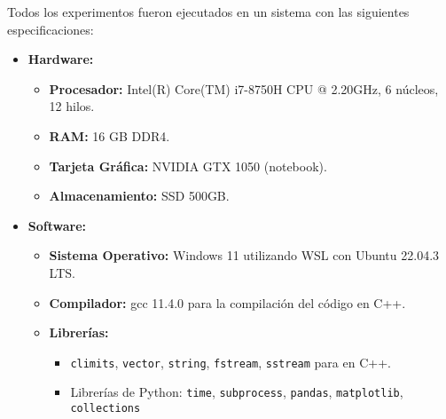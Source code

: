 Todos los experimentos fueron ejecutados en un sistema con las siguientes especificaciones:
\begin{itemize}
    \item \textbf{Hardware:}
    \begin{itemize}
        \item \textbf{Procesador:} Intel(R) Core(TM) i7-8750H CPU @ 2.20GHz, 6 núcleos, 12 hilos.
        \item \textbf{RAM:} 16 GB DDR4.
        \item \textbf{Tarjeta Gráfica:} NVIDIA GTX 1050 (notebook).
        \item \textbf{Almacenamiento:} SSD 500GB.
    \end{itemize}

    \item \textbf{Software:}
    \begin{itemize}
        \item \textbf{Sistema Operativo:} Windows 11 utilizando WSL con Ubuntu 22.04.3 LTS.
        \item \textbf{Compilador:} gcc 11.4.0 para la compilación del código en C++.
        \item \textbf{Librerías:} 
        \begin{itemize}
            \item \texttt{climits}, \texttt{vector}, \texttt{string}, \texttt{fstream}, \texttt{sstream} para en C++.
            \item Librerías de Python: \texttt{time}, \texttt{subprocess}, \texttt{pandas}, \texttt{matplotlib}, \texttt{collections} 
        \end{itemize}
    \end{itemize}
\end{itemize}
